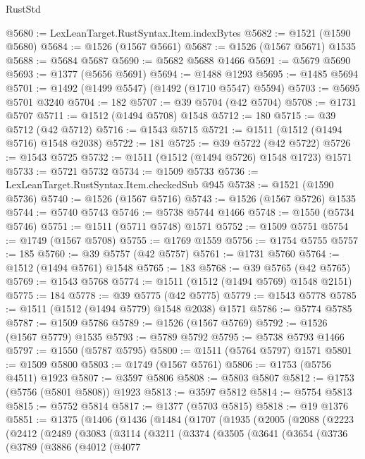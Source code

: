 \begin{lexlean}{RustStd}
\begin{coremodule}
{{@5680 := LexLeanTarget.RustSyntax.Item.indexBytes
@5682 := @1521 (@1590 @5680)
@5684 := @1526 (@1567 @5661)
@5687 := @1526 (@1567 @5671) @1535
@5688 := @5684 @5687
@5690 := @5682 @5688 @1466
@5691 := @5679 @5690
@5693 := @1377 (@5656 @5691)
@5694 := @1488 @1293
@5695 := @1485 @5694
@5701 := @1492 (@1499 @5547) (@1492 (@1710 @5547) @5594)
@5703 := @5695 @5701 @3240
@5704 := 182
@5707 := @39 @5704 (@42 @5704)
@5708 := @1731 @5707
@5711 := @1512 (@1494 @5708) @1548
@5712 := 180
@5715 := @39 @5712 (@42 @5712)
@5716 := @1543 @5715
@5721 := @1511 (@1512 (@1494 @5716) @1548 @2038)
@5722 := 181
@5725 := @39 @5722 (@42 @5722)
@5726 := @1543 @5725
@5732 := @1511 (@1512 (@1494 @5726) @1548 @1723) @1571
@5733 := @5721 @5732
@5734 := @1509 @5733
@5736 := LexLeanTarget.RustSyntax.Item.checkedSub @945
@5738 := @1521 (@1590 @5736)
@5740 := @1526 (@1567 @5716)
@5743 := @1526 (@1567 @5726) @1535
@5744 := @5740 @5743
@5746 := @5738 @5744 @1466
@5748 := @1550 (@5734 @5746)
@5751 := @1511 (@5711 @5748) @1571
@5752 := @1509 @5751
@5754 := @1749 (@1567 @5708)
@5755 := @1769 @1559
@5756 := @1754 @5755
@5757 := 185
@5760 := @39 @5757 (@42 @5757)
@5761 := @1731 @5760
@5764 := @1512 (@1494 @5761) @1548
@5765 := 183
@5768 := @39 @5765 (@42 @5765)
@5769 := @1543 @5768
@5774 := @1511 (@1512 (@1494 @5769) @1548 @2151)
@5775 := 184
@5778 := @39 @5775 (@42 @5775)
@5779 := @1543 @5778
@5785 := @1511 (@1512 (@1494 @5779) @1548 @2038) @1571
@5786 := @5774 @5785
@5787 := @1509 @5786
@5789 := @1526 (@1567 @5769)
@5792 := @1526 (@1567 @5779) @1535
@5793 := @5789 @5792
@5795 := @5738 @5793 @1466
@5797 := @1550 (@5787 @5795)
@5800 := @1511 (@5764 @5797) @1571
@5801 := @1509 @5800
@5803 := @1749 (@1567 @5761)
@5806 := @1753 (@5756 @4511) @1923
@5807 := @3597 @5806
@5808 := @5803 @5807
@5812 := @1753 (@5756 (@5801 @5808)) @1923
@5813 := @3597 @5812
@5814 := @5754 @5813
@5815 := @5752 @5814
@5817 := @1377 (@5703 @5815)
@5818 := @19 @1376
@5851 := @1375
    (@1406
      (@1436
        (@1484
          (@1707
            (@1935
              (@2005
                (@2088
                  (@2223
                    (@2412
                      (@2489
                        (@3083
                          (@3114
                            (@3211
                              (@3374
                                (@3505
                                  (@3641
                                    (@3654
                                      (@3736
                                        (@3789
                                          (@3886
                                            (@4012
                                              (@4077
}}
\end{coremodule}
\end{lexlean}
